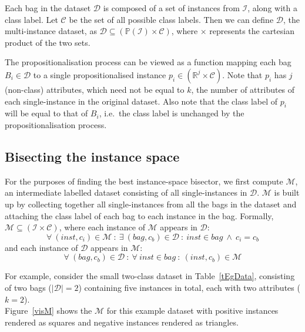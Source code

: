 \documentclass[a4paper,12pt]{article} %
\newcommand{\real}{\mathbb{R}}
\newcommand{\mcl}[1]{\mathcal{#1}}
\newcommand{\power}{\mathbb{P}}
\begin{document}
Each bag in the dataset $\mcl{D}$ is 
    composed of a set of instances from $\mcl{I}$,
    along with a class label. %
Let $\mcl{C}$ be the set of all possible class labels.
Then we can define $\mcl{D}$,
    the multi-instance dataset, as 
    $\mcl{D} \subseteq ( \power (\mcl{I}) \times \mcl{C} )$,
    where $\times$ represents the cartesian product of the two sets.

The propositionalisation process can be viewed as a function
    mapping each bag $B_i \in \mcl{D}$ to 
    a single propositionalised instance $p_i \in ( \real^j \times \mcl{C} )$.
Note that $p_i$ has $j$ (non-class) attributes, 
    which need not be equal to $k$, the number of attributes of 
    each single-instance in the original dataset.
Also note that the class label of $p_i$ will be 
    equal to that of $B_i$,
    i.e.\ the class label is unchanged by the propositionalisation process.
       

\subsection{Bisecting the instance space}

For the purposes of finding the best instance-space bisector,
    we first compute $\mcl{M}$, an intermediate labelled dataset 
    consisting of all single-instances in $\mcl{D}$.
$\mcl{M}$ is built up by collecting together all single-instances
    from all the bags in the dataset and 
    attaching the class label of each bag to 
    each instance in the bag.
Formally, $\mcl{M} \subseteq (\mcl{I} \times \mcl{C})$, 
    where each instance of $\mcl{M}$ appears in $\mcl{D}$:
    $$
        \forall~(inst,c_i)\in\mcl{M} ~:~ 
            \exists~(bag,c_b) \in \mcl{D} ~:~ 
                inst \in bag ~\land~ c_i = c_b
    $$
    and each instance of $\mcl{D}$ appears in $\mcl{M}$:
    $$
        \forall~(bag,c_b) \in \mcl{D} ~:~ 
            \forall~inst \in bag ~:~
                (inst,c_b) \in \mcl{M}
    $$    

For example, consider the small two-class dataset in Table~\ref{tEgData}, 
    consisting of two bags ($|\mcl{D}| = 2$)
    containing five instances in total, each with two attributes ($k=2$).\\
Figure~\ref{visM} shows the $\mcl{M}$ for this example dataset with 
    positive instances rendered as squares and 
    negative instances rendered as triangles.
\end{document}
